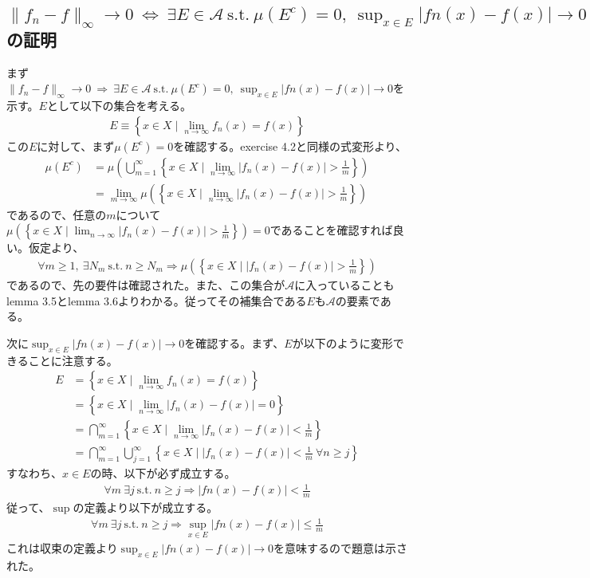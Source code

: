 \documentclass{article}
\begin{document}
\subsection{$\| f_n -f \|_{\infty} \to 0\ \Leftrightarrow\ \exists E\in \mathcal{A}\ \text{s.t.}\ \mu(E^c) = 0,\ \sup_{x\in E} |fn(x) - f(x)| \to 0$の証明}
まず$\| f_n -f \|_{\infty} \to 0\ \Rightarrow\ \exists E\in \mathcal{A}\ \text{s.t.}\ \mu(E^c) = 0,\ \sup_{x\in E} |fn(x) - f(x)| \to 0$を示す。$E$として以下の集合を考える。
\begin{align*}
	E \equiv \left\{ x\in X \mid \lim_{n \to \infty} f_n(x) = f(x) \right\}
\end{align*}
この$E$に対して、まず$\mu(E^c) = 0$を確認する。exercise 4.2と同様の式変形より、
\begin{align*}
	\mu(E^c) &= \mu\left( \bigcup_{m = 1}^{\infty} \left\{ x\in X \mid \lim_{n\to \infty} |f_n(x) - f(x)| > \frac{1}{m} \right\} \right)\\
	&= \lim_{m \to \infty} \mu \left( \left\{ x\in X \mid \lim_{n\to \infty} |f_n(x) - f(x)| > \frac{1}{m} \right\} \right)
\end{align*}
であるので、任意の$m$について$\mu \left( \left\{ x\in X \mid \lim_{n\to \infty} |f_n(x) - f(x)| > \frac{1}{m} \right\} \right) = 0$であることを確認すれば良い。仮定より、
\begin{align*}
	\forall m \geq 1,\ \exists N_m\ \text{s.t.}\ n \geq N_m \Rightarrow \mu\left( \left\{ x\in X \mid |f_n(x) - f(x)| > \frac{1}{m} \right\} \right)
\end{align*}
であるので、先の要件は確認された。また、この集合が$\mathcal{A}$に入っていることもlemma 3.5とlemma 3.6よりわかる。従ってその補集合である$E$も$\mathcal{A}$の要素である。

次に$\sup_{x\in E} |fn(x) - f(x)| \to 0$を確認する。まず、$E$が以下のように変形できることに注意する。
\begin{align*}
	E &= \left\{ x\in X \mid \lim_{n \to \infty} f_n(x) = f(x) \right\}\\
	&= \left\{ x\in X \mid \lim_{n \to \infty} |f_n(x)-f(x)| = 0 \right\}\\
	&= \bigcap_{m = 1}^{\infty} \left\{ x\in X \mid \lim_{n \to \infty} |f_n(x)-f(x)| < \frac{1}{m} \right\}\\
	&= \bigcap_{m = 1}^{\infty} \bigcup_{j = 1}^{\infty} \left\{ x\in X \mid |f_n(x)-f(x)| < \frac{1}{m}\ \forall n \geq j \right\}
\end{align*}
すなわち、$x\in E$の時、以下が必ず成立する。
\begin{align*}
	\forall m\ \exists j \ \text{s.t.}\ n \geq j \Rightarrow |fn(x) - f(x) | < \frac{1}{m}
\end{align*}
従って、$\sup$の定義より以下が成立する。
\begin{align*}
	\forall m\ \exists j \ \text{s.t.}\ n \geq j \Rightarrow \sup_{x \in E} |fn(x) - f(x) | \leq \frac{1}{m}
\end{align*}
これは収束の定義より$\sup_{x\in E} |fn(x) - f(x)| \to 0$を意味するので題意は示された。
\end{document}
